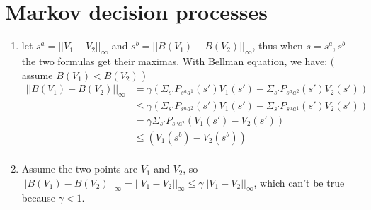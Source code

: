 \documentclass[12pt]{article}
\begin{document}
    \newpage
    \section*{Markov decision processes}
    \begin{enumerate}[label=(\alph*)]
        \item let $s^a = ||V_1-V_2||_\infty$ and  $s^b = ||B(V_1)-B(V_2)||_\infty$, thus when $s=s^a,s^b$ the two formulas get their maximas.
        With Bellman equation, we have: ( assume $B(V_1)<B(V_2)$ )
        \begin{equation*}
            \begin{split}
                ||B(V_1)-B(V_2)||_\infty &= \gamma (\Sigma_{s'} P_{s^a a^1}(s')V_1(s') - \Sigma_{s'} P_{s^a a^2}(s')V_2(s') ) \\
                &\leq \gamma (\Sigma_{s'} P_{s^a a^2}(s')V_1(s') - \Sigma_{s'} P_{s^a a^1}(s')V_2(s') ) \\
                &=\gamma \Sigma_{s'} P_{s^a a^2}(V_1(s') -V_2(s')) \\
                &\leq (V_1(s^b)-V_2(s^b))  \\
            \end{split}
        \end{equation*}
        \item Assume the two points are $V_1$ and $V_2$, so $||B(V_1)-B(V_2)||_\infty = ||V_1-V_2||_\infty \leq \gamma||V_1-V_2||_\infty$, 
        which can't be true because $\gamma < 1$.
    \end{enumerate}
\end{document}
